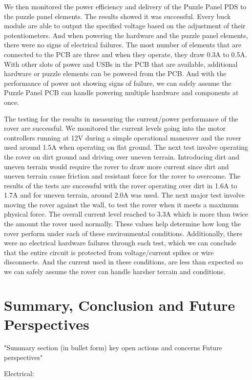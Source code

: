 \documentclass[a4paper, 10pt]{article}
\begin{document}
We then monitored the power efficiency and delivery of the Puzzle Panel PDS to the puzzle panel elements. The results showed it was successful. Every buck module are able to output the specified voltage based on the adjustment of their potentiometers. And when powering the hardware and the puzzle panel elements, there were no signs of electrical failures. The most number of elements that are connected to the PCB are three and when they operate, they draw 0.3A to 0.5A. With other slots of power and USBs in the PCB that are available, additional hardware or puzzle elements can be powered from the PCB. And with the performance of power not showing signs of failure, we can safely assume the Puzzle Panel PCB can handle powering multiple hardware and components at once.

The testing for the results in measuring the current/power performance of the rover are successful. We monitored the current levels going into the motor controllers running at 12V during a simple operational maneuver and the rover used around 1.5A when operating on flat ground. The next test involve operating the rover on dirt ground and driving over uneven terrain. Introducing dirt and uneven terrain would require the rover to draw more current since dirt and uneven terrain cause friction and resistant force for the rover to overcome. The results of the tests are successful with the rover operating over dirt in 1.6A to 1.7A and for uneven terrain, around 2.0A was used. The next major test involve moving the rover against the wall, to test the rover when it meets a maximum physical force. The overall current level reached to 3.3A which is more than twice the amount the rover used normally. These values help determine how long the rover perform under each of these environmental conditions. Additionally, there were no electrical hardware failures through each test, which we can conclude that the entire circuit is protected from voltage/current spikes or wire disconnects. And the current used in these conditions, are less than expected so we can safely assume the rover can handle harsher terrain and conditions.

\section{Summary, Conclusion and Future Perspectives}
"Summary section (in bullet form)
key open actions and concerns
Future perspectives"

Electrical:
\end{document}
